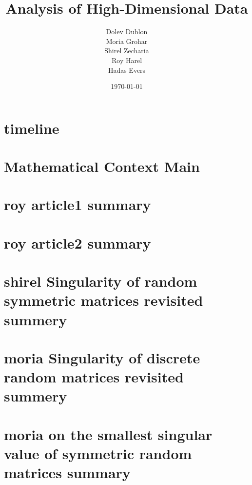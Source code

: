 \documentclass[12pt]{article}
\title{\textbf{Analysis of High-Dimensional Data}}
\author{
    Dolev Dublon\\
    Moria Grohar\\
    Shirel Zecharia\\
    Roy Harel\\
    Hadas Evers
}
\date{\today}
\begin{document}
\maketitle





\section{timeline}



\section{Mathematical Context Main}



\section{roy article1 summary}



\section{roy article2 summary}



\section{shirel Singularity of random symmetric matrices revisited summery}



\section{moria Singularity of discrete random matrices revisited summery}



\section{moria on the smallest singular value of symmetric random matrices summary}


\end{document}
